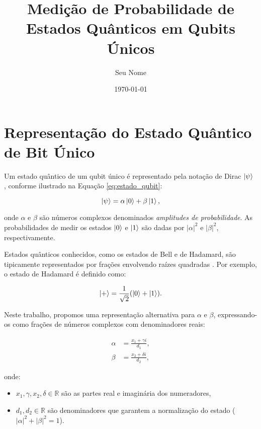 \documentclass[12pt, a4paper]{article}
\title{Medição de Probabilidade de Estados Quânticos em Qubits Únicos}
\author{Seu Nome}
\date{\today}
\begin{document}
\maketitle

\section{Representação do Estado Quântico de Bit Único}
\label{sec:representacao}

Um estado quântico de um qubit único é representado pela notação de Dirac \(\ket{\psi}\) \cite{referencia1}, conforme ilustrado na Equação \eqref{eq:estado_qubit}:

\begin{equation}
\ket{\psi} = \alpha\ket{0} + \beta\ket{1},
\label{eq:estado_qubit}
\end{equation}

onde \(\alpha\) e \(\beta\) são números complexos denominados \textit{amplitudes de probabilidade}. As probabilidades de medir os estados \(\ket{0}\) e \(\ket{1}\) são dadas por \(|\alpha|^2\) e \(|\beta|^2\), respectivamente.

Estados quânticos conhecidos, como os estados de Bell e de Hadamard, são tipicamente representados por frações envolvendo raízes quadradas \cite{nielsen2010, preskill1998}. Por exemplo, o estado de Hadamard é definido como:

\begin{equation}
\ket{+} = \frac{1}{\sqrt{2}}(\ket{0} + \ket{1}).
\label{eq:hadamard}
\end{equation}

Neste trabalho, propomos uma representação alternativa para \(\alpha\) e \(\beta\), expressando-os como frações de números complexos com denominadores reais:

\begin{align}
\alpha &= \frac{x_1 + \gamma i}{d_1}, \label{eq:alpha} \\
\beta &= \frac{x_2 + \delta i}{d_2}, \label{eq:beta}
\end{align}

onde:
\begin{itemize}
\item \(x_1, \gamma, x_2, \delta \in \mathbb{R}\) são as partes real e imaginária dos numeradores,
\item \(d_1, d_2 \in \mathbb{R}\) são denominadores que garantem a normalização do estado (\(|\alpha|^2 + |\beta|^2 = 1\)).
\end{itemize}
\end{document}
